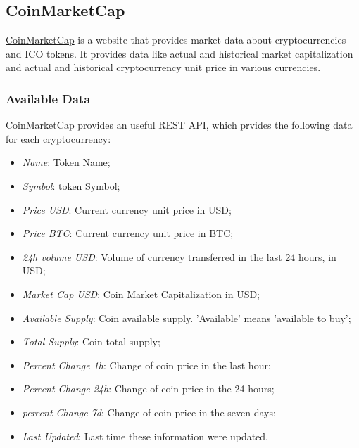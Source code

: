 \subsection{CoinMarketCap}
\href{https://coinmarketcap.com/}{CoinMarketCap} is a website that provides market data about cryptocurrencies and ICO tokens. It provides data like actual and historical market capitalization and actual and historical cryptocurrency unit price in various currencies.
\subsubsection{Available Data}
CoinMarketCap provides an useful REST API, which prvides the following data for each cryptocurrency:
\begin{itemize}
    \item \textit{Name}: Token Name;
    \item \textit{Symbol}: token Symbol;
    \item \textit{Price USD}: Current currency unit price in USD;
    \item \textit{Price BTC}: Current currency unit price in BTC;
    \item \textit{24h volume USD}: Volume of currency transferred in the last 24 hours, in USD;
    \item \textit{Market Cap USD}: Coin Market Capitalization in USD;
    \item \textit{Available Supply}: Coin available supply. 'Available' means 'available to buy';
    \item \textit{Total Supply}: Coin total supply;
    \item \textit{Percent Change 1h}: Change of coin price in the last hour;
    \item \textit{Percent Change 24h}: Change of coin price in the 24 hours;
    \item \textit{percent Change 7d}: Change of coin price in the seven days;
    \item \textit{Last Updated}: Last time these information were updated.
\end{itemize}
